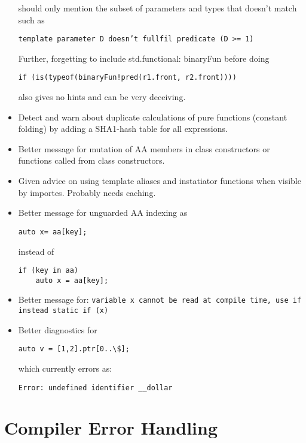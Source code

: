 \documentclass[xcolor=dvipsnames, twocolumn]{article}
\begin{document}
\begin{itemize}
should only mention the subset of parameters and types that doesn't match such as

\begin{lstlisting}[frame=single]
template parameter D doesn’t fullfil predicate (D >= 1)
\end{lstlisting}

Further, forgetting to include std.functional: binaryFun before doing
\begin{lstlisting}[frame=single]
if (is(typeof(binaryFun!pred(r1.front, r2.front))))
\end{lstlisting}
also gives no hints and can be very deceiving.

\item Detect and warn about duplicate calculations of pure functions (constant
  folding) by adding a SHA1-hash table for all expressions.
\item Better message for mutation of AA members in class constructors or
  functions called from class constructors.

\item Given advice on using template aliases and instatiator functions when
  visible by importes. Probably needs caching.

\item Better message for unguarded AA indexing as
\begin{lstlisting}[frame=single]
auto x= aa[key];
\end{lstlisting}
instead of
\begin{lstlisting}[frame=single]
if (key in aa)
    auto x = aa[key];
\end{lstlisting}

\item Better message for:
\texttt{variable x cannot be read at compile time, use if instead static if (x)}

\item Better diagnostics for
\begin{lstlisting}[frame=single]
auto v = [1,2].ptr[0..\$];
\end{lstlisting}
which currently errors as:
\begin{lstlisting}[frame=single]
Error: undefined identifier __dollar
\end{lstlisting}

\end{itemize}

\section{Compiler Error Handling}
\end{document}
